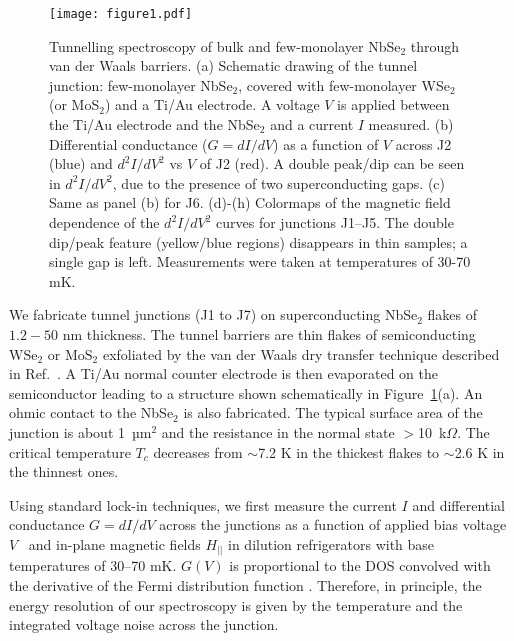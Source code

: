 \documentclass[showpacs,superscriptaddress,preprint,prb]{revtex4}
\begin{document}
 \begin{figure}	
	\texttt{[image: figure1.pdf]}	
	\caption{Tunnelling spectroscopy of bulk and few-monolayer NbSe$_2$ through van der Waals barriers. (a) Schematic drawing of the tunnel junction: few-monolayer NbSe$_2$, covered with few-monolayer WSe$_2$ (or MoS$_2$) and a Ti/Au electrode. A voltage $V$ is applied between the Ti/Au electrode and the NbSe$_2$ and a current $I$ measured. (b) Differential conductance ($G = dI/dV$) as a function of $V$ across J2 (blue) and $d^2I/dV^2$ vs $V$ of J2 (red). A double peak/dip can be seen in $d^2I/dV^2$, due to the presence of two superconducting gaps. (c) Same as panel (b) for J6. (d)-(h) Colormaps of the magnetic field dependence of the $d^2I/dV^2$ curves for junctions J1--J5. The double dip/peak feature (yellow/blue regions) disappears in thin samples; a single gap is left. Measurements were taken at temperatures of 30-70 mK. }
	\label{Figure1}
\end{figure}


We fabricate tunnel junctions (J1 to J7) on superconducting NbSe$_2$ flakes of $1.2-50$ nm thickness. The tunnel barriers are thin flakes of semiconducting $\mathrm{WSe_2}$ or $\mathrm{MoS_2}$ exfoliated by the van der Waals dry transfer technique described in Ref.~\cite{dvir}. A Ti/Au normal counter electrode is then evaporated on the semiconductor leading to a structure shown schematically in Figure~\ref{Figure1}(a). An ohmic contact to the NbSe$_2$ is also fabricated. The typical surface area of the junction is about 1~µm$^2$ and the resistance in the normal state $>$10~k$\Omega$. The critical temperature $T_c$ decreases from $\sim$7.2 K in the thickest flakes to $\sim$2.6 K in the thinnest ones. 

Using standard lock-in techniques, we first measure the current $I$ and differential conductance $G=dI/dV$ across the junctions as a function of applied bias voltage $V$~\cite{giaever1960} and in-plane magnetic fields $H_{||}$ in dilution refrigerators with base temperatures of 30--70 mK. $G(V)$ is proportional to the DOS convolved with the derivative of the Fermi distribution function \cite{tinkham}. Therefore, in principle, the energy resolution of our spectroscopy is given by the temperature and the integrated voltage noise across the junction. 
\end{document}
